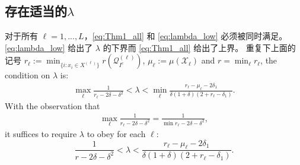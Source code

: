 \documentclass[main.tex]{subfiles}
\begin{document}
\subsection{存在适当的$\lambda$}\label{sec:exist_lambda}

对于所有 $\ell=1,...,L$，\eqref{eq:Thm1_all} 和 \eqref{eq:lambda_low}
必须被同时满足。 \eqref{eq:lambda_low} 给出了 $\lambda$ 的下界而 \eqref{eq:Thm1_all}
给出了上界。 重复下上面的记号 $r_{\ell}:=\min_{\{i: x_i\in X^{(\ell)}\}}r(\mathcal{Q}^{(\ell)}_{I^c})$,
$\mu_{\ell}:=\mu(\mathcal{X}_{\ell})$ and $r=\min_{\ell} r_{\ell}$, the condition on $\lambda$ is:
\begin{align*}
  \max_{\ell}\frac{1}{r_{\ell} - 2\delta-\delta^2}<\lambda < \min_{\ell}\frac{r_{\ell}-\mu_{\ell}-2\delta_1}{\delta(1+\delta)(2+r_{\ell}-\delta_1)}.
\end{align*}
With the observation that
\begin{align*}
\max_{\ell}\frac{1}{r_{\ell} - 2\delta-\delta^2}
= \frac{1}{\min r_{\ell} - 2\delta-\delta^2},
\end{align*}
it suffices to require $\lambda$ to obey for each $\ell$:
\begin{equation}\label{eq:lambda_range}
\frac{1}{r - 2\delta-\delta^2}<
        \lambda<\frac{r_{\ell}-\mu_{\ell}-2\delta_1}{\delta(1+\delta)(2+r_{\ell}-\delta_1)}.
\end{equation}




\end{document}
